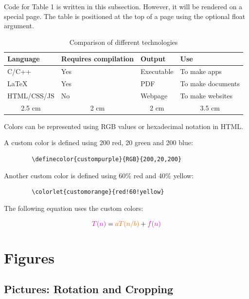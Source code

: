 \documentclass[12pt,a4paper]{article}
\begin{document}
	Code for Table 1 is written in this subsection. However, it will
	be rendered on a special page. The table is positioned at the
	top of a page using the optional float argument.
	
	\begin{table}[!t]
		\centering
		\caption{Comparison of different technologies}
		\label{tab:technologies}
		
		\begin{tabular}{|p{2.5cm}|p{2cm}|p{2cm}|p{3.5cm}|}
			\hline
			Language & Requires compilation & Output & Use \\
			\hline
			C/C++ & Yes & Executable & To make apps \\
			\hline
			\LaTeX & Yes & PDF & To make documents \\
			\hline
			HTML/CSS/JS & No & Webpage & To make websites \\
			\hline
			\multicolumn{1}{|c|}{2.5 cm} &
			\multicolumn{1}{c|}{2 cm} &
			\multicolumn{1}{c|}{2 cm} &
			\multicolumn{1}{c|}{3.5 cm} \\
			\hline
		\end{tabular}
	\end{table}
	
	Colors can be represented using RGB values or hexadecimal
	notation in HTML.
	
	A custom color is defined using 200 red, 20 green and 200 blue:
	
	\begin{verbatim}
		\definecolor{custompurple}{RGB}{200,20,200}
	\end{verbatim}
	
	Another custom color is defined using 60\% red and 40\% yellow:
	
	\begin{verbatim}
		\colorlet{customorange}{red!60!yellow}
	\end{verbatim}
	
	The following equation uses the custom colors:
	
	\[
	\textcolor{custompurple}{T(n)}
	=
	\textcolor{customorange}{aT(n/b)}
	+
	\textcolor{custompurple}{f(n)}
	\]
	
	\section{Figures}
	
	\subsection{Pictures: Rotation and Cropping}
	
\end{document}
